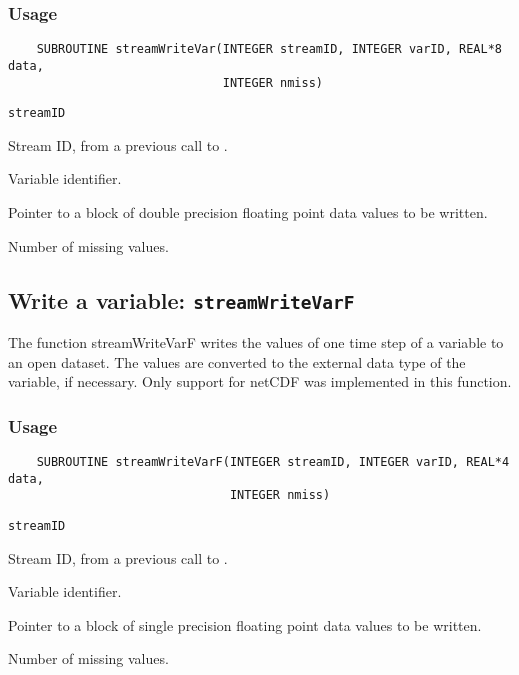 \subsubsection*{Usage}

\begin{verbatim}
    SUBROUTINE streamWriteVar(INTEGER streamID, INTEGER varID, REAL*8 data, 
                              INTEGER nmiss)
\end{verbatim}

\hspace*{4mm}\begin{minipage}[]{15cm}
\begin{deflist}{\tt streamID\ }
\item[{\tt streamID}]
Stream ID, from a previous call to {}.
\item[{\tt varID}]
Variable identifier.
\item[{\tt data}]
Pointer to a block of double precision floating point data values to be written.
\item[{\tt nmiss}]
Number of missing values.

\end{deflist}
\end{minipage}


\subsection{Write a variable: {\tt streamWriteVarF}}
\label{streamWriteVarF}

The function streamWriteVarF writes the values of one time step of a variable to an open dataset.
The values are converted to the external data type of the variable, if necessary.
Only support for netCDF was implemented in this function.
\subsubsection*{Usage}

\begin{verbatim}
    SUBROUTINE streamWriteVarF(INTEGER streamID, INTEGER varID, REAL*4 data, 
                               INTEGER nmiss)
\end{verbatim}

\hspace*{4mm}\begin{minipage}[]{15cm}
\begin{deflist}{\tt streamID\ }
\item[{\tt streamID}]
Stream ID, from a previous call to {}.
\item[{\tt varID}]
Variable identifier.
\item[{\tt data}]
Pointer to a block of single precision floating point data values to be written.
\item[{\tt nmiss}]
Number of missing values.

\end{deflist}
\end{minipage}


